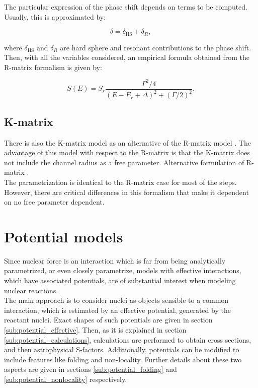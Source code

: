 \documentclass[openany]{book}
\begin{document}
The particular expression of the phase shift depends on terms to be computed. Usually, this is approximated by:

\begin{equation}  \label{eq:rmatrix_phaseShift}
	\delta = \delta_{\mathrm{HS}} + \delta_R,
\end{equation}

where $\delta_{\mathrm{HS}}$ and $\delta_R$ are hard sphere and resonant contributions to the phase shift. \\

Then, with all the variables considered, an empirical formula obtained from the R-matrix formalism is given by:

\begin{equation} \label{eq:rmatrix_sfactor}
	S(E) = S_r \frac{\Gamma^2/4}{(E-E_r + \Delta)^2 + (\Gamma/2)^2}.
\end{equation}

\subsection{K-matrix} \label{sub:kmatrix}

There is also the K-matrix model as an alternative of the R-matrix model \cite{humblet_1990}. The advantage of this model with respect to the R-matrix is that the K-matrix does not include the channel radius as a free parameter.  Alternative formulation of R-matrix \cite{brune_2002}. \\

The parametrization is identical to the R-matrix case for most of the steps. However, there are critical differences in this formalism that make it dependent on no free parameter dependent. 

\section{Potential models} \label{sec:potentialModels}


Since nuclear force is an interaction which is far from being analytically parametrized, or even closely parametrize, models with effective interactions, which have associated potentials, are of substantial interest when modeling nuclear reactions.  \\

The main approach is to consider nuclei as objects sensible to a common interaction, which is estimated by an effective potential, generated by the reactant nuclei. Exact shapes of such potentials are given in section \ref{sub:potential_effective}. Then, as it is explained in section \ref{sub:potential_calculations}, calculations are performed to obtain cross sections, and then astrophysical S-factors. Additionally, potentials can be modified to include features like folding and non-locality. Further details about these two aspects are given in sections \ref{sub:potential_folding} and \ref{sub:potential_nonlocality} respectively.
\end{document}
